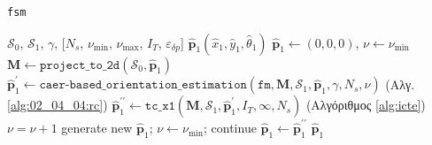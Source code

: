 \begin{algorithm}
  \caption{\texttt{fsm}}
  \begin{spacing}{1.2}
  \begin{algorithmic}[1]
    \REQUIRE $\mathcal{S}_0$, $\mathcal{S}_1$, $\gamma$, [$N_s$, $\nu_{\min}$, $\nu_{\max}$, $I_T$, $\varepsilon_{\delta p}$]
    \ENSURE $\hat{\bm{p}}_1(\hat{x}_1, \hat{y}_1, \hat{\theta}_1)$
    \STATE $\hat{\bm{p}}_1 \leftarrow (0,0,0)$, $\nu \leftarrow \nu_{\min}$
    \STATE $\bm{M} \leftarrow \texttt{project\_to\_2d}(\mathcal{S}_0, \hat{\bm{p}}_1)$
    \WHILE {$\nu \leq \nu_{\max}$}
      \STATE $\hat{\bm{p}}_1^\prime \leftarrow \texttt{caer-based\_orientation\_estimation}(\texttt{fm}, \bm{M}, \mathcal{S}_1, \hat{\bm{p}}_1, \gamma, N_s, \nu)$ \hfill (Αλγ. \ref{alg:02_04_04:rc})
      \STATE $\hat{\bm{p}}_1^{\prime\prime} \leftarrow \texttt{tc\_x1}(\bm{M}, \mathcal{S}_1, \hat{\bm{p}}_1^\prime, I_T, \infty, N_s)$  \hfill (Αλγόριθμος \ref{alg:icte})
        \STATE $\nu = \nu + 1$
      \ENDIF
        \STATE generate new $\hat{\bm{p}}_1$; $\nu \leftarrow \nu_{\min}$; continue
      \ENDIF
      \STATE $\hat{\bm{p}}_1 \leftarrow \hat{\bm{p}}_1^{\prime\prime}$
    \ENDWHILE
    \RETURN $\hat{\bm{p}}_1$
  \end{algorithmic}
  \end{spacing}
  \label{alg:algorithm_fsm}
\end{algorithm}
